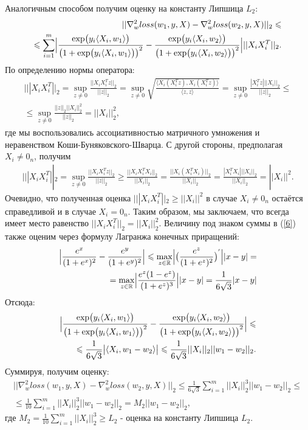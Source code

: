 \documentclass[12pt,twoside]{article}
\begin{document}
 Аналогичным способом получим оценку на константу Липшица $L_2$:
\begin{eqnarray} \label{6}
||\nabla_w^2 loss(w_1, y, X) - \nabla_w^2 loss(w_2, y, X)||_2 \leq \nonumber \\ 
\leq \sum\limits_{i = 1}^m\Bigl|\frac{\exp\bigl(y_i\langle X_i, w_1 \rangle\bigr)}{\bigl(1 + \exp\bigl(y_i\langle X_i, w_1 \rangle\bigr)\bigr)^2} - \frac{\exp\bigl(y_i\langle X_i, w_2 \rangle\bigr)}{\bigl(1 + \exp\bigl(y_i\langle X_i, w_2 \rangle\bigr)\bigr)^2}\Bigr|||X_iX_i^T||_2.
\end{eqnarray}
По определению нормы оператора:
\begin{eqnarray}
|||X_iX_i^T||_2 = \sup_{z \neq 0} \frac{||X_iX_i^T z||_2}{||z||_2} = \sup_{z \neq 0} \sqrt{\frac{\bigl\langle X_i(X_i^Tz), X_i(X_i^T z) \bigr\rangle}{\langle z, z \rangle}} = \sup_{z \neq 0} \frac{|X_i^Tz|||X_i||_2}{||z||_2} \leq \nonumber \\ \leq \sup_{z \neq 0} \frac{||z||_2||X_i||_2^2}{||z||_2} = ||X_i||_2^2,
\end{eqnarray}
где мы воспользовались ассоциативностью матричного умножения и неравенством Коши-Буняковского-Шварца. С другой стороны, предполагая $X_i \neq 0_n$, получим 
\begin{eqnarray}
|||X_iX_i^T||_2 = \sup_{z \neq 0} \frac{||X_iX_i^T z||_2}{||z||_2} \geq \frac{||X_iX_i^T X_i||_2}{||X_i||_2} = \frac{||X_i(X_i^T X_i)||_2}{||X_i||_2} = \frac{|X_i^T X_i|||X_i||_2}{||X_i||_2} = ||X_i||^2.
\end{eqnarray}
Очевидно, что полученная оценка $|||X_iX_i^T||_2 \geq ||X_i||^2$ в случае $X_i \neq 0_n$ остаётся справедливой и в случае $X_i = 0_n$. Таким образом, мы заключаем, что всегда имеет место равенство $||X_iX_i^T||_2 = ||X_i||_2^2$. Величину под знаком суммы в (\ref{6}) также оценим через формулу Лагранжа конечных приращений:
\begin{eqnarray}
\Bigl|\frac{e^x}{(1 + e^x)^2} - \frac{e^y}{(1 + e^y)^2}\Bigr| \leq \max_{z \in \mathbb{R}}\Bigl|\bigl(\frac{e^z}{(1 + e^z)^2}\bigr)^{'}\Bigr||x - y| = \nonumber \\ = \max_{z \in \mathbb{R}}\Bigl|\frac{e^z(1 - e^z)}{(1 + e^z)^3}\Bigr||x - y| = \frac{1}{6\sqrt{3}}|x - y|
\end{eqnarray}
Отсюда:
\begin{eqnarray}
\Bigl|\frac{\exp\bigl(y_i\langle X_i, w_1 \rangle\bigr)}{\bigl(1 + \exp\bigl(y_i\langle X_i, w_1 \rangle\bigr)\bigr)^2} - \frac{\exp\bigl(y_i\langle X_i, w_2 \rangle\bigr)}{\bigl(1 + \exp\bigl(y_i\langle X_i, w_2 \rangle\bigr)\bigr)^2}\Bigr| \leq \nonumber \\ \leq \frac{1}{6\sqrt{3}}\bigl|\langle X_i, w_1 - w_2\rangle \bigr| \leq \frac{1}{6\sqrt{3}}||X_i||_2||w_1 - w_2||_2.
\end{eqnarray} 
Суммируя, получим оценку:
\begin{eqnarray}
||\nabla_w^2 loss(w_1, y, X) - \nabla_w^2 loss(w_2, y, X)||_2 \leq \frac{1}{6\sqrt{3}}\sum\limits_{i = 1}^m ||X_i||_2^3 ||w_1 - w_2||_2 \leq \nonumber \\ \leq \frac{1}{10}\sum\limits_{i = 1}^m ||X_i||_2^3 ||w_1 - w_2||_2 = M_2||w_1 - w_2||_2,
\end{eqnarray}
где $M_2 = \frac{1}{10}\sum\limits_{i = 1}^m ||X_i||_2^3 \geq L_2$ - оценка на константу Липшица $L_2$.
\end{document}

